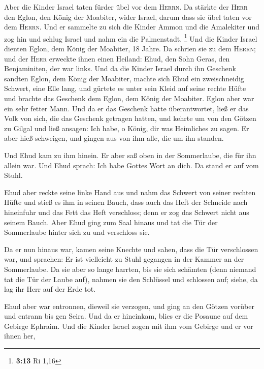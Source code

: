  Aber die Kinder Israel taten fürder übel vor dem
\textsc{Herrn}. Da stärkte der \textsc{Herr} den Eglon, den König der
Moabiter, wider Israel, darum dass sie übel taten vor dem
\textsc{Herrn}.  Und er sammelte zu sich die Kinder Ammon
und die Amalekiter und zog hin und schlug Israel und nahm ein die
Palmenstadt. \footnote{\textbf{3:13} Ri 1,16}  Und die
Kinder Israel dienten Eglon, dem König der Moabiter, 18 Jahre.
 Da schrien sie zu dem \textsc{Herrn}; und der
\textsc{Herr} erweckte ihnen einen Heiland: Ehud, den Sohn Geras, den
Benjaminiten, der war links. Und da die Kinder Israel durch ihn Geschenk
sandten Eglon, dem König der Moabiter,  machte sich Ehud
ein zweischneidig Schwert, eine Elle lang, und gürtete es unter sein
Kleid auf seine rechte Hüfte  und brachte das Geschenk
dem Eglon, dem König der Moabiter. Eglon aber war ein sehr fetter Mann.
 Und da er das Geschenk hatte überantwortet, ließ er das
Volk von sich, die das Geschenk getragen hatten,  und
kehrte um von den Götzen zu Gilgal und ließ ansagen: Ich habe, o König,
dir was Heimliches zu sagen. Er aber hieß schweigen, und gingen aus von
ihm alle, die um ihn standen.

 Und Ehud kam zu ihm hinein. Er aber saß oben in der
Sommerlaube, die für ihn allein war. Und Ehud sprach: Ich habe Gottes
Wort an dich. Da stand er auf vom Stuhl.

 Ehud aber reckte seine linke Hand aus und nahm das
Schwert von seiner rechten Hüfte und stieß es ihm in seinen Bauch,
 dass auch das Heft der Schneide nach hineinfuhr und das
Fett das Heft verschloss; denn er zog das Schwert nicht aus seinem
Bauch.  Aber Ehud ging zum Saal hinaus und tat die Tür
der Sommerlaube hinter sich zu und verschloss sie.

 Da er nun hinaus war, kamen seine Knechte und sahen,
dass die Tür verschlossen war, und sprachen: Er ist vielleicht zu Stuhl
gegangen in der Kammer an der Sommerlaube.  Da sie aber
so lange harrten, bis sie sich schämten (denn niemand tat die Tür der
Laube auf), nahmen sie den Schlüssel und schlossen auf; siehe, da lag
ihr Herr auf der Erde tot.

 Ehud aber war entronnen, dieweil sie verzogen, und ging
an den Götzen vorüber und entrann bis gen Seira.  Und da
er hineinkam, blies er die Posaune auf dem Gebirge Ephraim. Und die
Kinder Israel zogen mit ihm vom Gebirge und er vor ihnen her,

